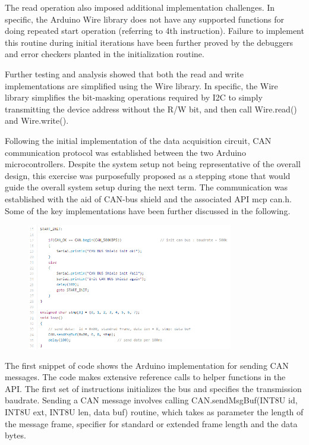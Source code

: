 \documentclass{article}
\begin{document}
\begin{flushleft}
The read operation also imposed additional implementation challenges. In specific, the Arduino Wire library does not have any supported functions for doing repeated start operation (referring to 4th instruction). Failure to implement this routine during initial iterations have been further proved by the debuggers and error checkers planted in the initialization routine. 
\end{flushleft}

\begin{flushleft}
Further testing and analysis showed that both the read and write implementations are simplified using the Wire library. In specific, the Wire library simplifies the bit-masking operations required by I2C to simply transmitting the device address without the R/W bit, and then call Wire.read() and Wire.write(). 
\end{flushleft}

\begin{flushleft}
Following the initial implementation of the data acquisition circuit, CAN communication protocol was established between the two Arduino microcontrollers. Despite the system setup not being representative of the overall design, this exercise was purposefully proposed as a stepping stone that would guide the overall system setup during the next term. The communication was established with the aid of CAN-bus shield and the associated API mcp can.h. Some of the key implementations have been further discussed in the following. 
\end{flushleft}

\begin{figure}[!ht]
\centering 
\includegraphics[width=9cm]{4.png}
\end{figure}

\begin{flushleft}
The first snippet of code shows the Arduino implementation for sending CAN messages. The code makes extensive reference calls to helper functions in the API. The first set of instructions initializes the bus and specifies the transmission baudrate. Sending a CAN message involves calling CAN.sendMsgBuf(INT8U id, INT8U ext, INT8U len, data buf) routine, which takes as parameter the length of the message frame, specifier for standard or extended frame length and the data bytes. 
\end{flushleft}
\end{document}
